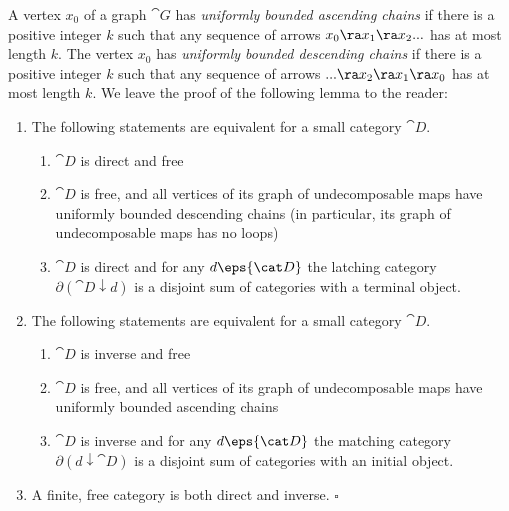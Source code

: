 
A vertex $x_0$ of a graph ${\cat G}$ has {\it uniformly bounded ascending chains} if there is a positive integer $k$ such that any sequence of arrows $x_0 \ra x_1 \ra x_2 ...$ has at most length $k$. The vertex $x_0$ has {\it uniformly bounded descending chains} if there is a positive integer $k$ such that any sequence of arrows $... \ra x_2 \ra x_1 \ra x_0$ has at most length $k$. We leave the proof of the following lemma to the reader:

\begin{lem}
\label{lem:descrfinitefreecat}
\mbox{}
\begin{enumerate}
\item
The following statements are equivalent for a small category ${\cat D}$.
\begin{enumerate}
\item
${\cat D}$ is direct and free
\item
${\cat D}$ is free, and all vertices of its graph of undecomposable maps have uniformly bounded descending chains (in particular, its graph of undecomposable maps has no loops)
\item
${\cat D}$ is direct and for any $d \eps {\cat D}$ the latching category $\partial({\cat D} \downarrow d)$ is a disjoint sum of categories with a terminal object.
\end{enumerate}
\item
The following statements are equivalent for a small category ${\cat D}$.
\begin{enumerate}
\item
${\cat D}$ is inverse and free
\item
${\cat D}$ is free, and all vertices of its graph of undecomposable maps have uniformly bounded ascending chains
\item
${\cat D}$ is inverse and for any $d \eps {\cat D}$ the matching category $\partial(d \downarrow {\cat D})$ is a disjoint sum of categories with an initial object. 
\end{enumerate}
\item
A finite, free category is both direct and inverse. $\square$
\end{enumerate}

\end{lem}


